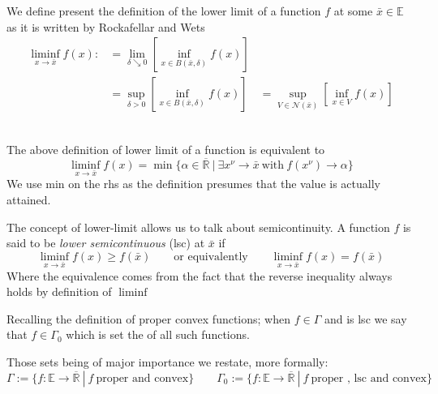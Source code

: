 \begin{definition}
We define present the definition of the lower limit of a function $f$ at some
$\bar x\in\mathbb E$ as it is written by Rockafellar and Wets
\autocite{rockafellar2009variational}
\begin{align*}
	\liminf_{x\rightarrow \bar x} f(x) :&= \lim_{\delta \searrow 0}
	\left[\inf_{x\in B(\bar x,\delta)}f(x)\right]\\[2ex]
		&=\sup_{\delta >0}\left[\inf_{x\in B(\bar x,\delta)}f(x)\right]
		\quad = \sup_{V\in \mathcal{N}(\bar x)}\left[\inf_{x\in V}f(x)\right]
\end{align*}
\end{definition}
\begin{prop}
	\autocite{rockafellar2009variational}\\
The above definition of lower limit of a function is equivalent to
\begin{equation*}
	\liminf_{x\rightarrow\bar x}f(x) = \min\{\alpha\in\overline{\mathbb R}\ 
		| \ \exists x^{\nu} \rightarrow \bar x \ \text{with}
	\ f(x^{\nu})\rightarrow \alpha\} 
\end{equation*}
We use min on the rhs as the definition presumes that the value is actually attained.
\end{prop}
%
\begin{definition}
The concept of lower-limit allows us to talk about semicontinuity. 
A function $f$ is said to be \emph{lower semicontinuous} (lsc) at $\bar x$  if
\begin{equation*}
	\liminf_{x\rightarrow\bar x}f(x) \geq f(\bar x) 
	\qquad \text{or equivalently} \qquad 
	\liminf_{x\rightarrow\bar x}f(x)=f(\bar x)
\end{equation*}
Where the equivalence comes from the fact that the reverse inequality always holds
by definition of $\liminf$
\end{definition}
%
\clearpage
\begin{definition}
Recalling the definition of proper convex functions; when $f\in\Gamma$ and is lsc
we say that $f\in \Gamma_0$ which is set the of all such functions.
\end{definition}
Those sets being of major importance we restate, more formally:
\begin{equation*}
	\Gamma:= \{f:\mathbb E \longrightarrow \mathbb \overline{\mathbb R} \
	| \ f \ \text{proper and convex}\}
	\qquad \Gamma_0 := 
	\{f:\mathbb E \longrightarrow \mathbb \overline{\mathbb R} \
	| \ f \ \text{proper , lsc and convex}\}
\end{equation*}
